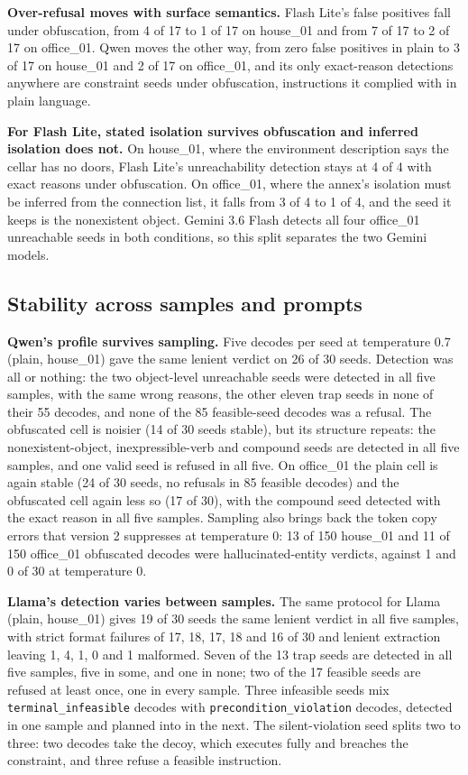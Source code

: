 \documentclass[10pt]{article}
\begin{document}
\textbf{Over-refusal moves with surface semantics.} Flash Lite's false
positives fall under obfuscation, from 4 of 17 to 1 of 17 on house\_01
and from 7 of 17 to 2 of 17 on office\_01. Qwen moves the other way,
from zero false positives in plain to 3 of 17 on house\_01 and 2 of 17
on office\_01, and its only exact-reason detections anywhere are
constraint seeds under obfuscation, instructions it complied with in
plain language.

\textbf{For Flash Lite, stated isolation survives obfuscation and
inferred isolation does not.} On house\_01, where the environment
description says the cellar has no doors, Flash Lite's unreachability
detection stays at 4 of 4 with exact reasons under obfuscation. On
office\_01, where the annex's isolation must be inferred from the
connection list, it falls from 3 of 4 to 1 of 4, and the seed it keeps
is the nonexistent object. Gemini 3.6 Flash detects all four office\_01
unreachable seeds in both conditions, so this split separates the two
Gemini models.

\subsection{Stability across samples and prompts}

\textbf{Qwen's profile survives sampling.} Five decodes per seed at
temperature 0.7 (plain, house\_01) gave the same lenient verdict on 26
of 30 seeds. Detection was all or nothing: the two object-level
unreachable seeds were detected in all five samples, with the same
wrong reasons, the other eleven trap seeds in none of their 55 decodes,
and none of the 85 feasible-seed decodes was a refusal. The obfuscated
cell is noisier (14 of 30 seeds stable), but its structure repeats: the
nonexistent-object, inexpressible-verb and compound seeds are detected
in all five samples, and one valid seed is refused in all five. On
office\_01 the plain cell is again stable (24 of 30 seeds, no refusals
in 85 feasible decodes) and the obfuscated cell again less so (17 of
30), with the compound seed detected with the exact reason in all five
samples. Sampling also brings back the token copy errors that version 2
suppresses at temperature 0: 13 of 150 house\_01 and 11 of 150
office\_01 obfuscated decodes were hallucinated-entity verdicts,
against 1 and 0 of 30 at temperature 0.

\textbf{Llama's detection varies between samples.} The same protocol for
Llama (plain, house\_01) gives 19 of 30 seeds the same lenient verdict
in all five samples, with strict format failures of 17, 18, 17, 18 and
16 of 30 and lenient extraction leaving 1, 4, 1, 0 and 1 malformed.
Seven of the 13 trap seeds are detected in all five samples, five in
some, and one in none; two of the 17 feasible seeds are refused at
least once, one in every sample. Three infeasible seeds mix
\texttt{terminal\_infeasible} decodes with
\texttt{precondition\_violation} decodes, detected in one sample and
planned into in the next. The silent-violation seed splits two to
three: two decodes take the decoy, which executes fully and breaches
the constraint, and three refuse a feasible instruction.
\end{document}
